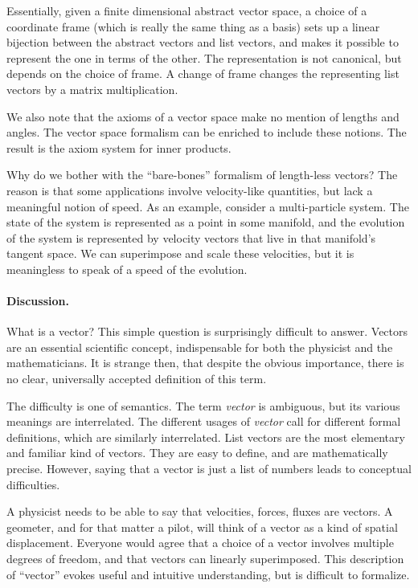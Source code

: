 \documentclass[12pt]{article}
\begin{document}
\begin{itemize}
  Essentially, given a finite dimensional abstract vector space, a
  choice of a coordinate frame (which is really the same thing as a
  basis) sets up a linear bijection between the abstract vectors and
  list vectors, and makes it possible to represent the one in terms of
  the other.  The representation is not canonical, but depends on the
  choice of frame.  A change of frame changes the representing list
  vectors by a matrix multiplication.
  
  We also note that the axioms of a vector space make no mention of
  lengths and angles.  The vector space formalism can be enriched to
  include these notions.  The result is the axiom system for inner
  products.
  
  Why do we bother with the ``bare-bones'' formalism of length-less
  vectors? The reason is that some applications involve velocity-like
  quantities, but lack a meaningful notion of speed.  As an example,
  consider a multi-particle system.  The state of the system is
  represented as a point in some manifold, and the evolution of the
  system is represented by velocity vectors that live in that
  manifold's tangent space.  We can superimpose and scale these
  velocities, but it is meaningless to speak of a speed of the
  evolution.

\end{itemize}

\paragraph{Discussion.}
What is a vector?  This simple question is surprisingly difficult to
answer.  Vectors are an essential scientific concept, indispensable
for both the physicist and the mathematicians.  It is strange then,
that despite the obvious importance, there is no clear, universally
accepted definition of this term.

The difficulty is one of semantics. The term {\em vector} is
ambiguous, but its various meanings are interrelated.  The different
usages of {\em vector} call for different formal definitions, which
are similarly interrelated.  List vectors are the most elementary and
familiar kind of vectors.  They are easy to define, and are
mathematically precise.  However, saying that a vector is just a list
of numbers leads to conceptual difficulties.

A physicist needs to be able to say that velocities, forces, fluxes
are vectors.  A geometer, and for that matter a pilot, will think of a
vector as a kind of spatial displacement.  Everyone would agree that a
choice of a vector involves multiple degrees of freedom, and that
vectors can linearly superimposed.  This description of ``vector''
evokes useful and intuitive understanding, but is difficult to
formalize.  
\end{document}
